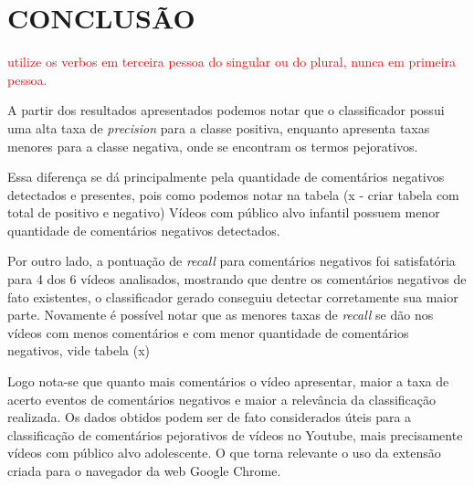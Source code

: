 \section{CONCLUSÃO}

\textcolor{red}{utilize os verbos em terceira pessoa do singular ou do plural, nunca em primeira pessoa.}

A partir dos resultados apresentados podemos notar que o classificador possui uma alta taxa de \textit{precision} para a classe positiva, enquanto apresenta taxas menores para a classe negativa, onde se encontram os termos pejorativos.

Essa diferença se dá principalmente pela quantidade de comentários negativos detectados e presentes, pois como podemos notar na tabela (x - criar tabela com total de positivo e negativo) %
Vídeos com público alvo infantil possuem menor quantidade de comentários negativos detectados.

Por outro lado, a pontuação de \textit{recall} para comentários negativos foi satisfatória para 4 dos 6 vídeos analisados, mostrando que dentre os comentários negativos de fato existentes, o classificador gerado conseguiu detectar corretamente sua maior parte. Novamente é possível notar que as menores taxas de \textit{recall} se dão nos vídeos com menos comentários e com menor quantidade de comentários negativos, vide tabela (x)%


Logo nota-se que quanto mais comentários o vídeo apresentar, maior a taxa de acerto eventos de comentários negativos e maior a relevância da classificação realizada.
Os dados obtidos podem ser de fato considerados úteis para a classificação de comentários pejorativos de vídeos no Youtube, mais precisamente vídeos com público alvo adolescente. O que torna relevante o uso da extensão criada para o navegador da web Google Chrome.
